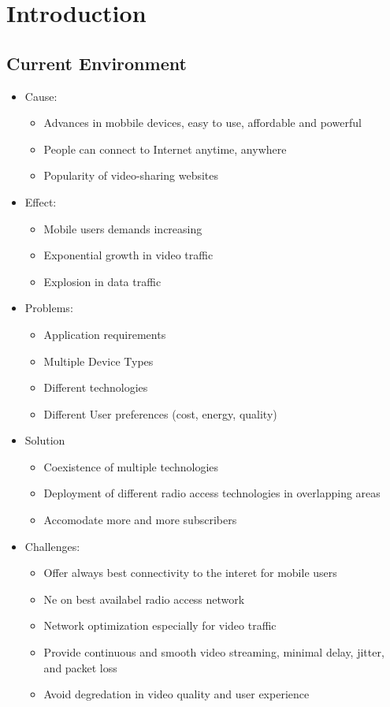 \section{Introduction}
\subsection{Current Environment}
\begin{itemize}
	\item Cause:
	\begin{itemize}
		\item Advances in mobbile devices, easy to use, affordable and
			powerful
		\item People can connect to Internet anytime, anywhere
		\item Popularity of video-sharing websites
	\end{itemize}
	\item Effect:
	\begin{itemize}
		\item Mobile users demands increasing
		\item Exponential growth in video traffic
		\item Explosion in data traffic
	\end{itemize}
	\item Problems:
	\begin{itemize}
		\item Application requirements
		\item Multiple Device Types
		\item Different technologies
		\item Different User preferences (cost, energy, quality)
	\end{itemize}
	\item Solution
	\begin{itemize}
		\item Coexistence of multiple technologies
		\item Deployment of different radio access technologies in
			overlapping areas
		\item Accomodate more and more subscribers
	\end{itemize}
	\item Challenges:
	\begin{itemize}
		\item Offer always best connectivity to the interet for mobile
			users
		\item Ne on best availabel radio access network
		\item Network optimization especially for video traffic
		\item Provide continuous and smooth video streaming, minimal
			delay, jitter, and packet loss
		\item Avoid degredation in video quality and user experience
	\end{itemize}
\end{itemize}
